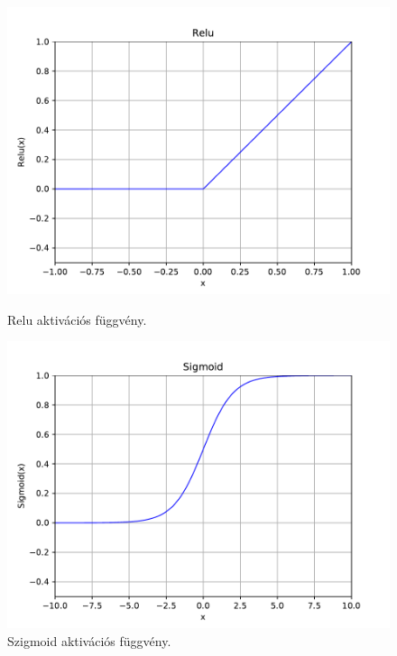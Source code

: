 \begin{itemize}
\begin{figure} [h!]
		\begin{minipage}[c]{0.30\linewidth}
			\centering
			\includegraphics[width=\textwidth]{img/relu.pdf}
					\captionsetup{justification=centering}
			\caption{Relu aktivációs függvény.}
			\label{fig:relu}
			
		\end{minipage}\hfill
		\begin{minipage}[c]{0.30\linewidth}
			\centering
			\includegraphics[width=\textwidth]{img/sigmoid.pdf}
					\captionsetup{justification=centering}
			\caption{Szigmoid aktivációs függvény.}
			\label{fig:sigmoid}
			
		\end{minipage}
		\begin{minipage}[c]{0.30\linewidth}
			

\end{minipage}
\end{figure}
\end{itemize}

